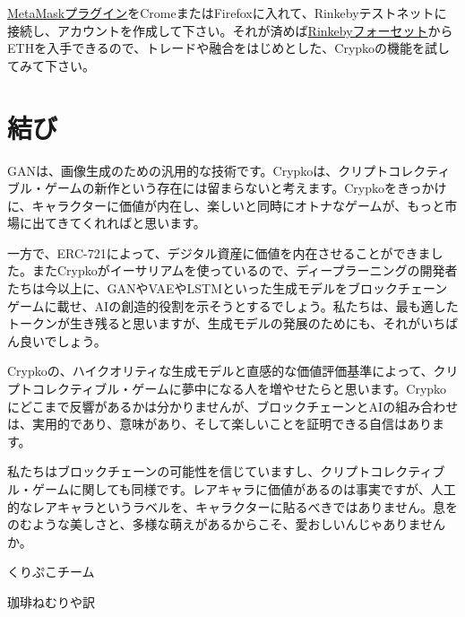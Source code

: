 \documentclass[xelatex,ja=standard]{bxjsarticle}
\begin{document}
\href{https://metamask.io/}{MetaMaskプラグイン}をCromeまたはFirefoxに入れて、Rinkebyテストネットに接続し、アカウントを作成して下さい。それが済めば\href{https://www.rinkeby.io/#faucet}{Rinkebyフォーセット}からETHを入手できるので、トレードや融合をはじめとした、Crypkoの機能を試してみて下さい。

\section{結び}

GANは、画像生成のための汎用的な技術です。Crypkoは、クリプトコレクティブル・ゲームの新作という存在には留まらないと考えます。Crypkoをきっかけに、キャラクターに価値が内在し、楽しいと同時にオトナなゲームが、もっと市場に出てきてくれればと思います。

一方で、ERC-721によって、デジタル資産に価値を内在させることができました。またCrypkoがイーサリアムを使っているので、ディープラーニングの開発者たちは今以上に、GANやVAEやLSTMといった生成モデルをブロックチェーンゲームに載せ、AIの創造的役割を示そうとするでしょう。私たちは、最も適したトークンが生き残ると思いますが、生成モデルの発展のためにも、それがいちばん良いでしょう。

Crypkoの、ハイクオリティな生成モデルと直感的な価値評価基準によって、クリプトコレクティブル・ゲームに夢中になる人を増やせたらと思います。Crypkoにどこまで反響があるかは分かりませんが、ブロックチェーンとAIの組み合わせは、実用的であり、意味があり、そして楽しいことを証明できる自信はあります。

私たちはブロックチェーンの可能性を信じていますし、クリプトコレクティブル・ゲームに関しても同様です。レアキャラに価値があるのは事実ですが、人工的なレアキャラというラベルを、キャラクターに貼るべきではありません。息をのむような美しさと、多様な萌えがあるからこそ、愛おしいんじゃありませんか。

\vspace{5mm}

\begin{flushright}
 くりぷこチーム
 
 珈琲ねむりや訳
\end{flushright}

\renewcommand\refname{参考文献}


\end{document}
